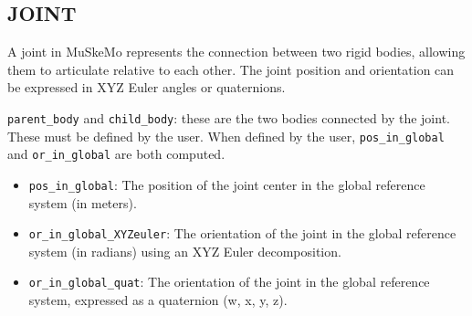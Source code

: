 \documentclass{article}
\begin{document}







\subsection{JOINT}
\label{sec:joint}

A joint in MuSkeMo represents the connection between two rigid bodies, allowing them to articulate relative to each other. The joint position and orientation can be expressed in XYZ Euler angles or quaternions.

\texttt{parent\_body} and \texttt{child\_body}: these are the two bodies connected by the joint. These must be defined by the user. When defined by the user, \texttt{pos\_in\_global} and \texttt{or\_in\_global} are both computed.

\begin{itemize}
    \item \texttt{pos\_in\_global}: The position of the joint center in the global reference system (in meters).
    \item \texttt{or\_in\_global\_XYZeuler}: The orientation of the joint in the global reference system (in radians) using an XYZ Euler decomposition.
    \item \texttt{or\_in\_global\_quat}: The orientation of the joint in the global reference system, expressed as a quaternion (w, x, y, z).
\end{itemize}
\end{document}
